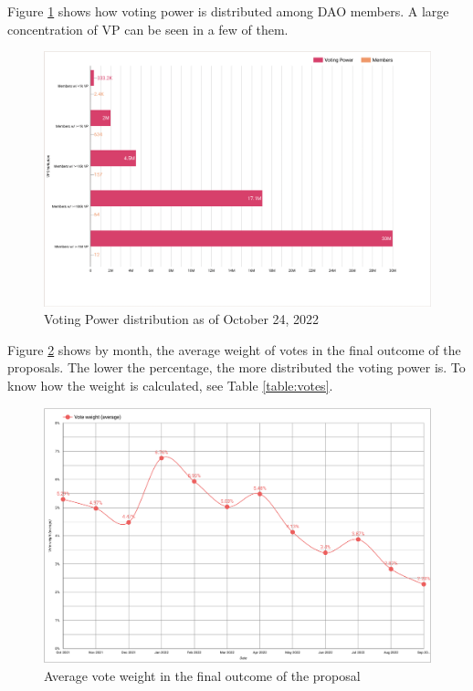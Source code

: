 \documentclass[MSE,Master,english]{twbook}%
\begin{document}
Figure \ref{fig:vp_distribution_members} shows how voting power is distributed among DAO members. A large concentration of VP can be seen in a few of them.
\begin{figure}[H]
  \centering
  \includegraphics[width=\textwidth]{metrics/vp_distribution_members.png}
  \caption{Voting Power distribution as of October 24, 2022}
  \label{fig:vp_distribution_members}
\end{figure}

Figure \ref{fig:vote_weight} shows by month, the average weight of votes in the final outcome of the proposals. The lower the percentage, the more distributed the voting power is. To know how the weight is calculated, see Table \ref{table:votes}.
\begin{figure}[H]
  \centering
  \includegraphics[width=\textwidth]{metrics/vote_weight.png}
  \caption{Average vote weight in the final outcome of the proposal}
  \label{fig:vote_weight}
\end{figure}
\end{document}
